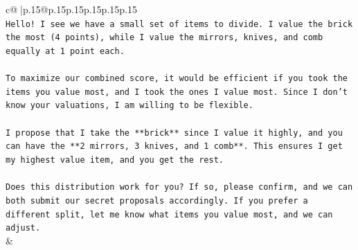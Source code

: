 \documentclass{article}
\begin{document}
{\begin{supertabular}{c@{$\;$}|p{.15\linewidth}@{}p{.15\linewidth}p{.15\linewidth}p{.15\linewidth}p{.15\linewidth}p{.15\linewidth}}
{{{\\ 
\texttt{Hello! I see we have a small set of items to divide. I value the brick the most (4 points), while I value the mirrors, knives, and comb equally at 1 point each.} \\
\\ 
\texttt{To maximize our combined score, it would be efficient if you took the items you value most, and I took the ones I value most. Since I don't know your valuations, I am willing to be flexible.} \\
\\ 
\texttt{I propose that I take the **brick** since I value it highly, and you can have the **2 mirrors, 3 knives, and 1 comb**. This ensures I get my highest value item, and you get the rest.} \\
\\ 
\texttt{Does this distribution work for you? If so, please confirm, and we can both submit our secret proposals accordingly. If you prefer a different split, let me know what items you value most, and we can adjust.} \\
            }
        }
    }
    & \\ \\


\end{supertabular}}
\end{document}
